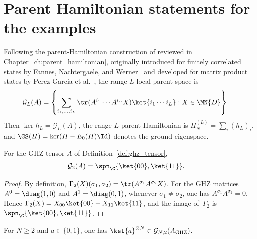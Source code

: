 \section{Parent Hamiltonian statements for the examples}\label{sec:example_parent_hamiltonians}

Following the parent-Hamiltonian construction of
\cite[lines~1988--2000]{Cirac2021Matrix} reviewed in
Chapter~\ref{ch:parent_hamiltonian}, originally introduced for finitely
correlated states by Fannes, Nachtergaele, and Werner~\cite{Fannes1992Finitely}
and developed for matrix product states by Perez-Garcia et
al.~\cite{PerezGarcia2007Matrix}, the range-$L$ local parent space is
\begin{align}
    \mathcal G_L(A)
     & =
    \left\{\sum_{i_1,\ldots,i_L}
    \tr(A^{i_1}\cdots A^{i_L}X)
    \ket{i_1\cdots i_L}
    : X\in \MN{D}\right\}.
    \notag
\end{align}
Then $\ker h_L = \mathcal G_L(A)$, the range-$L$ parent Hamiltonian is
$H_N^{(L)} = \sum_i (h_L)_i$, and $\GS(H)=\ker(H-E_0(H)\Id)$ denotes the ground
eigenspace.

\begin{lemma}\label{thm:ghz_ground_space_two}
    \leanok
    For the GHZ tensor $A$ of Definition~\ref{def:ghz_tensor},
    \begin{align}
        \mathcal G_2(A)
         & =
        \spn_{\C}\{\ket{00},\ket{11}\}.
        \notag
    \end{align}
\end{lemma}

\begin{proof}
    \leanok
    By definition,
    $\Gamma_2(X)(\sigma_1,\sigma_2)
        =\tr(A^{\sigma_1}A^{\sigma_2}X)$.
    For the GHZ matrices $A^0=\diag(1,0)$ and $A^1=\diag(0,1)$, whenever
    $\sigma_1\ne\sigma_2$, one has $A^{\sigma_1}A^{\sigma_2}=0$. Hence
    $\Gamma_2(X)=X_{00}\ket{00}+X_{11}\ket{11}$, and the image of~$\Gamma_2$
    is $\spn_{\C}\{\ket{00},\ket{11}\}$.
\end{proof}

\begin{lemma}
    \label{thm:constant_ket_mem_ghz_chain_ground_space}
    \leanok
    For $N\ge2$ and $a\in\{0,1\}$, one has
    $\ket{a}^{\otimes N}\in\mathcal G_{N,2}(A_{\mathrm{GHZ}})$.
\end{lemma}

